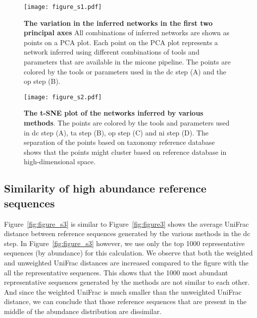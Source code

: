     \begin{figure}[H]
      \centering
      \texttt{[image: figure\_s1.pdf]}
    \end{figure}
    \begin{figure}[H]
      \centering
        \caption{
          \textbf{The variation in the inferred networks in the first two principal axes}
          All combinations of inferred networks are shown as points on a PCA plot.
          Each point on the PCA plot represents a network inferred using different combinations of tools and parameters that are available in the \ac{micone} pipeline.
          The points are colored by the tools or parameters used in the \ac{dc} step (A) and the \ac{op} step (B).
        }
      \label{fig:figure_s1}
    \end{figure}
    \FloatBarrier
    \newpage

    \begin{figure}[H]
      \centering
      \texttt{[image: figure\_s2.pdf]}
    \end{figure}
    \begin{figure}[H]
      \centering
        \caption{
          \textbf{The t-SNE plot of the networks inferred by various methods}.
          The points are colored by the tools and parameters used in \ac{dc} step (A), \ac{ta} step (B), \ac{op} step (C) and \ac{ni} step (D).
          The separation of the points based on taxonomy reference database shows that the points might cluster based on reference database in high-dimensional space.
        }
      \label{fig:figure_s2}
    \end{figure}
    \FloatBarrier
    \newpage

  \subsection*{Similarity of high abundance reference sequences}

    Figure~\ref{fig:figure_s3} is similar to Figure~\ref{fig:figure3} shows the average UniFrac distance between reference sequences generated by the various methods in the \ac{dc} step.
    In Figure~\ref{fig:figure_s3} however, we use only the top 1000 representative sequences (by abundance) for this calculation.
    We observe that both the weighted and unweighted UniFrac distances are increased compared to the figure with the all the representative sequences.
    This shows that the 1000 most abundant representative sequences generated by the methods are not similar to each other.
    And since the weighted UniFrac is much smaller than the unweighted UniFrac distance, we can conclude that those reference sequences that are present in the middle of the abundance distribution are dissimilar.

